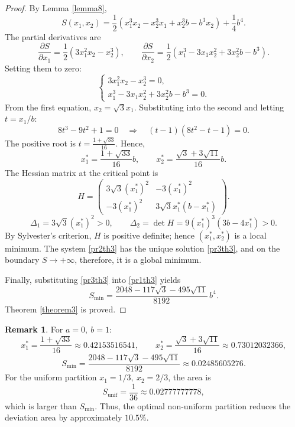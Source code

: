 \documentclass[amstex,16pt, amssymb]{article}
\theoremstyle{plain}
\theoremstyle{definition}
\newtheorem{remark}{Remark}[section]
\numberwithin{equation}{section}
\numberwithin{equation}{section}
\begin{document}
\begin{proof}
By Lemma \ref{lemma8},
\begin{equation}\label{pr1th3}
S(x_1,x_2)=\frac12\left(x_1^3x_2-x_2^3x_1+x_2^3b-b^3x_2\right)+\frac14 b^4. 
\end{equation}
The partial derivatives are
\[
\frac{\partial S}{\partial x_1}=\frac12(3x_1^2x_2-x_2^3),\qquad
\frac{\partial S}{\partial x_2}=\frac12(x_1^3-3x_1x_2^2+3x_2^2b-b^3).
\]
Setting them to zero:
\begin{equation}\label{pr2th3}
\begin{cases}
3x_1^2x_2-x_2^3=0,\\
x_1^3-3x_1x_2^2+3x_2^2b-b^3=0.
\end{cases} 
\end{equation}
From the first equation, \(x_2=\sqrt{3}x_1\). Substituting into the second and letting \(t=x_1/b\):
\[
8t^3-9t^2+1=0 \quad\Rightarrow\quad (t-1)(8t^2-t-1)=0.
\]
The positive root is \(t=\frac{1+\sqrt{33}}{16}\). Hence,
\begin{equation}\label{pr3th3}
x_1^*=\frac{1+\sqrt{33}}{16}b,\qquad
x_2^*=\frac{\sqrt{3}+3\sqrt{11}}{16}b. 
\end{equation}
The Hessian matrix at the critical point is
\[
H=
\begin{pmatrix}
3\sqrt{3}(x_1^{*})^2 & -3(x_1^{*})^2 \\
-3(x_1^{*})^2 & 3\sqrt{3}x_1^{*}(b-x_1^{*})
\end{pmatrix}.
\]
\[
\Delta_1=3\sqrt{3}(x_1^{*})^2>0,\qquad
\Delta_2=\det H=9(x_1^{*})^3(3b-4x_1^{*})>0.
\]
By Sylvester's criterion, \(H\) is positive definite; hence \((x_1^*,x_2^*)\) is a local minimum. The system \eqref{pr2th3} has the unique solution \eqref{pr3th3}, and on the boundary \(S\to+\infty\), therefore, it is a global minimum.

Finally, substituting \eqref{pr3th3} into \eqref{pr1th3} yields
\[
S_{\min}=
\frac{2048-117\sqrt{3}-495\sqrt{11}}{8192}\,b^4.
\]
Theorem \ref{theorem3} is proved. 
\end{proof}

\begin{remark}
For $a=0,\ b=1$:
\[
x_1^*=\frac{1+\sqrt{33}}{16}\approx 0.42153516541,\qquad
x_2^*=\frac{\sqrt{3}+3\sqrt{11}}{16}\approx 0.73012032366,
\]
\[
S_{\min}=\frac{2048-117\sqrt{3}-495\sqrt{11}}{8192}\approx 0.02485605276.
\]
For the uniform partition $x_1=1/3,\ x_2=2/3$, the area is
\[
S_{\text{unif}}=\frac{1}{36}\approx 0.02777777778,
\]
which is larger than $S_{\min}$. Thus, the optimal non-uniform partition reduces the deviation area by approximately $10.5\%$.
\end{remark}
\end{document}
